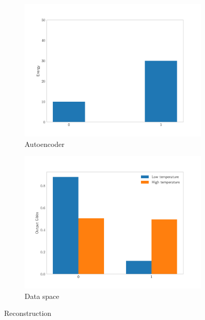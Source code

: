 \begin{figure}[!h]
\centering
\begin{subfigure}{.5\textwidth}
  \centering
  \includegraphics[width=.75\linewidth]{figures/input-gibbs}
  \caption{Autoencoder}
  \label{fig:ae}
\end{subfigure}%
\begin{subfigure}{.5\textwidth}
  \centering
  \includegraphics[width=.75\linewidth]{figures/result-gibbs}
  \caption{Data space}
  \label{fig:ae-process}
\end{subfigure}
\caption{Reconstruction}
\label{fig:test}
\end{figure}



